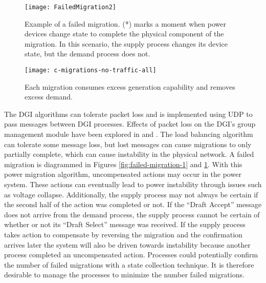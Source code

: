 \begin{figure}
\centering
\texttt{[image: FailedMigration2]}
\caption{Example of a failed migration. (*) marks a moment when power devices change state to complete the physical component of the migration. In this scenario, the supply process changes its device state, but the demand process does not.}
\label{fig:failed-migration-2}
\end{figure}

\begin{figure}
\centering
\texttt{[image: c-migrations-no-traffic-all]}
\caption{Each migration consumes excess generation capability and removes excess demand.}
\label{fig:good-migrations}
\end{figure}

The \ac{DGI} algorithms can tolerate packet loss and is implemented using UDP to pass messages between \ac{DGI} processes.
Effects of packet loss on the \ac{DGI}'s group management module have been explored in \cite{CRITIS2012} and \cite{JOURNAL}.
The load balancing algorithm can tolerate some message loss, but lost messages can cause migrations to only partially complete, which can cause instability in the physical network.
A failed migration is diagrammed in Figures \ref{fig:failed-migration-1} and \ref{fig:failed-migration-2}.
With this power migration algorithm, uncompensated actions may occur in the power system.
These actions can eventually lead to power instability through issues such as voltage collapse.
Additionally, the supply process may not always be certain if the second half of the action was completed or not.
If the ``Draft Accept'' message does not arrive from the demand process, the supply process cannot be certain of whether or not its ``Draft Select'' message was received.
If the supply process takes action to compensate by reversing the migration and the confirmation arrives later the system will also be driven towards instability because another process completed an uncompensated action.
Processes could potentially confirm the number of failed migrations with a state collection technique.
It is therefore desirable to manage the processes to minimize the number failed migrations.


